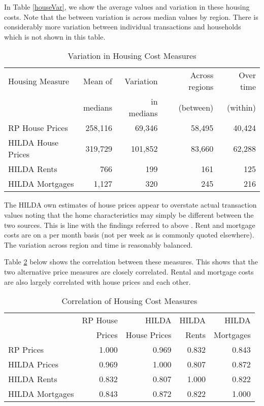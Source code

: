\documentclass[12pt]{article}
\begin{document}
In Table \ref{houseVar}, we show the average values and variation in these housing costs. Note that the between variation is across median values by region. There is considerably more variation between individual transactions and households which is not shown in this table.



\begin{table}[htpb]
\centering
\caption{Variation in Housing Cost Measures}
\label{houseVar1}
\begin{tabular}{lrrrr}
\toprule
Housing Measure & Mean of & Variation & Across regions & Over time\tabularnewline
 & medians & in medians & (between) & (within)\tabularnewline
\midrule
  RP House Prices & 258,116 & 69,346 & 58,495 & 40,424 \\
  HILDA House Prices & 319,729 & 101,852 & 83,660 & 62,288 \\
  HILDA Rents & 766 & 199 & 161 & 125 \\
  HILDA Mortgages & 1,127 & 320 & 245 & 216 \\
\bottomrule
\end{tabular}
\end{table}

The HILDA own estimates of house prices appear to overstate actual transaction values noting that the home characteristics may simply be different between the two sources. This is line with the findings referred to above \parencite{henriques2013perceptions}. Rent and mortgage costs are on a per month basis (not per week as is commonly quoted elsewhere). The variation across region and time is reasonably balanced.

Table \ref{houseCor} below shows the correlation between these measures. This shows that the two alternative price measures are closely correlated. Rental and mortgage costs are also largely correlated with house prices and each other.

\begin{table}[htpb] \centering
  \caption{Correlation of Housing Cost Measures}
  \label{houseCor}
\begin{tabular}{@{}lrrrr@{}}
\toprule
 & RP House & HILDA & HILDA & HILDA \tabularnewline
 & Prices & House Prices & Rents & Mortgages \tabularnewline
\midrule
RP Prices & 1.000 & 0.969 & 0.832 & 0.843 \\
  HILDA Prices & 0.969 & 1.000 & 0.807 & 0.872 \\
  HILDA Rents & 0.832 & 0.807 & 1.000 & 0.822 \\
  HILDA Mortgages & 0.843 & 0.872 & 0.822 & 1.000 \\
\bottomrule
\end{tabular}
\end{table}
\end{document}
